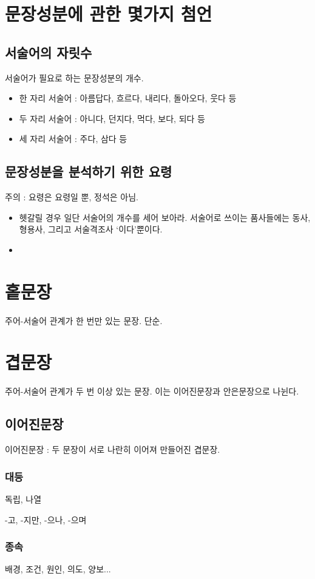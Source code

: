 \documentclass[10pt]{report}
\newcommand{\tl}{\textquoteleft}
\newcommand{\tr}{\textquoteright}
\begin{document}
\section{문장성분에 관한 몇가지 첨언}
\subsection{서술어의 자릿수}
서술어가 필요로 하는 문장성분의 개수.
\begin{itemize}
\item 한 자리 서술어 : 아름답다, 흐르다, 내리다, 돌아오다, 웃다 등
\item 두 자리 서술어 : 아니다, 던지다, 먹다, 보다, 되다 등
\item 세 자리 서술어 : 주다, 삼다 등
\end{itemize}
\subsection{문장성분을 분석하기 위한 요령}
주의 : 요령은 요령일 뿐, 정석은 아님.
\begin{itemize}
\item 헷갈릴 경우 일단 서술어의 개수를 세어 보아라. 서술어로 쓰이는 품사들에는 동사, 형용사, 그리고 서술격조사 \tl 이다\tr  뿐이다.
\item \color{blue}{추가바람}
\end{itemize}
\section{홑문장}
주어-서술어 관계가 한 번만 있는 문장. 단순.
\section{겹문장}
주어-서술어 관계가 두 번 이상 있는 문장. 이는 이어진문장과 안은문장으로 나뉜다.
\subsection{이어진문장}
이어진문장 : 두 문장이 서로 나란히 이어져 만들어진 겹문장.
\subsubsection{대등}
독립, 나열

-고, -지만, -으나, -으며
\subsubsection{종속}
배경, 조건, 원인, 의도, 양보...
\end{document}
